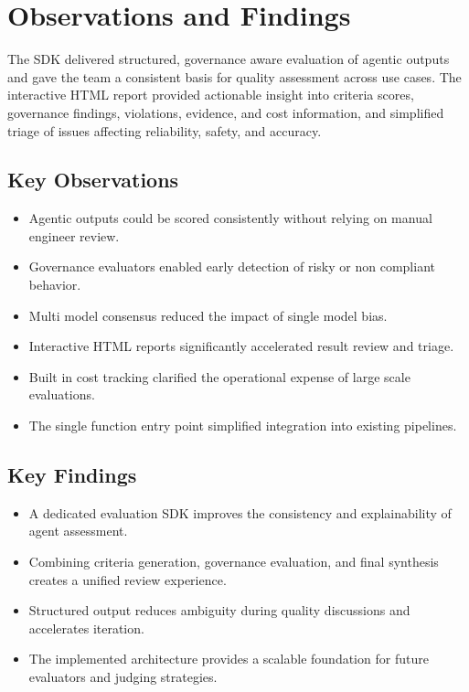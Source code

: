 \documentclass[12pt, a4paper, oneside]{report}
\begin{document}
\chapter{Observations and Findings}

The SDK delivered structured, governance aware evaluation of agentic outputs and gave the team a consistent basis for quality assessment across use cases. The interactive HTML report provided actionable insight into criteria scores, governance findings, violations, evidence, and cost information, and simplified triage of issues affecting reliability, safety, and accuracy.

\section{Key Observations}

\begin{itemize}
    \item Agentic outputs could be scored consistently without relying on manual engineer review.
    \item Governance evaluators enabled early detection of risky or non compliant behavior.
    \item Multi model consensus reduced the impact of single model bias.
    \item Interactive HTML reports significantly accelerated result review and triage.
    \item Built in cost tracking clarified the operational expense of large scale evaluations.
    \item The single function entry point simplified integration into existing pipelines.
\end{itemize}

\section{Key Findings}

\begin{itemize}
    \item A dedicated evaluation SDK improves the consistency and explainability of agent assessment.
    \item Combining criteria generation, governance evaluation, and final synthesis creates a unified review experience.
    \item Structured output reduces ambiguity during quality discussions and accelerates iteration.
    \item The implemented architecture provides a scalable foundation for future evaluators and judging strategies.
\end{itemize}
\end{document}
